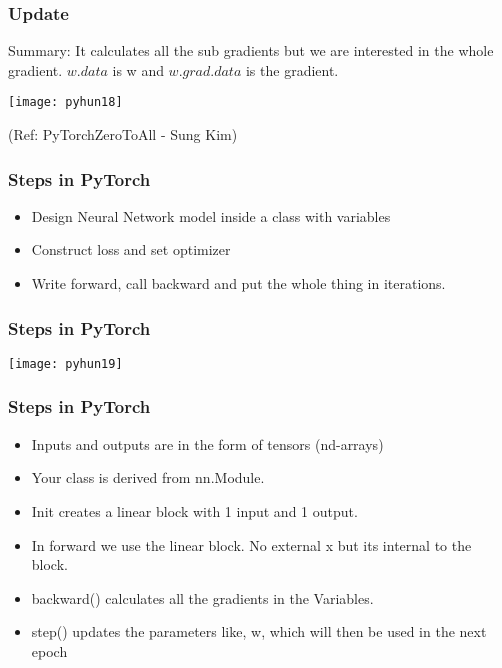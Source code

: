 \begin{frame}[fragile] \frametitle{Update}
Summary: It calculates all the sub gradients but we are interested in the whole gradient. $w.data$ is w and $w.grad.data$ is the gradient.

\begin{center}
\texttt{[image: pyhun18]}
\end{center}


(Ref: PyTorchZeroToAll  - Sung Kim)
\end{frame}

\begin{frame}[fragile] \frametitle{Steps in PyTorch}
\begin{itemize}
\item Design Neural Network model inside a class with variables
\item Construct loss and set optimizer
\item Write forward, call backward and put the whole thing in iterations.

\end{itemize}
\end{frame}

\begin{frame}[fragile] \frametitle{Steps in PyTorch}


\begin{center}
\texttt{[image: pyhun19]}
\end{center}





\end{frame}

\begin{frame}[fragile] \frametitle{Steps in PyTorch}
\begin{itemize}
\item Inputs and outputs are in the form of tensors (nd-arrays)
\item Your class is derived from nn.Module.
\item Init creates a linear block with 1 input and 1 output.
\item In forward we use the linear block. No external x but its internal to the block.
\item backward() calculates all the gradients in the Variables.
\item step() updates the parameters like, w, which will then be used in the next epoch
\end{itemize}
\end{frame}


